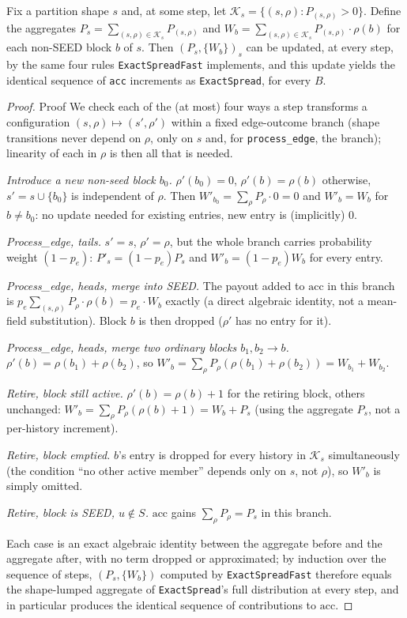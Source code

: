 \documentclass[ijoc,sglanonrev]{informs4}
\begin{document}
\begin{repeattheorem}
Fix a partition shape $s$ and, at some step, let
$\mathcal K_s=\{(s,\rho):P_{(s,\rho)}>0\}$. Define the aggregates
$P_s=\sum_{(s,\rho)\in\mathcal K_s}P_{(s,\rho)}$ and
$W_b=\sum_{(s,\rho)\in\mathcal K_s}P_{(s,\rho)}\cdot\rho(b)$ for each
non-SEED block $b$ of $s$. Then $(P_s,\{W_b\})_s$ can be updated, at every
step, by the same four rules \texttt{ExactSpreadFast} implements, and this
update yields the identical sequence of \texttt{acc} increments as
\texttt{ExactSpread}, for every $B$.
\end{repeattheorem}
\begin{proof}{Proof}
We check each of the (at most) four ways a step transforms a configuration
$(s,\rho)\mapsto(s',\rho')$ within a fixed edge-outcome branch (shape
transitions never depend on $\rho$, only on $s$ and, for
\texttt{process\_edge}, the branch); linearity of each in $\rho$ is then
all that is needed.

\emph{Introduce a new non-seed block $b_0$.} $\rho'(b_0)=0$,
$\rho'(b)=\rho(b)$ otherwise, $s'=s\cup\{b_0\}$ is independent of $\rho$.
Then $W'_{b_0}=\sum_\rho P_\rho\cdot 0=0$ and $W'_b=W_b$ for $b\ne b_0$: no
update needed for existing entries, new entry is (implicitly) $0$.

\emph{Process\_edge, tails.} $s'=s$, $\rho'=\rho$, but the whole branch
carries probability weight $(1-p_e)$: $P'_s=(1-p_e)P_s$ and
$W'_b=(1-p_e)W_b$ for every entry.

\emph{Process\_edge, heads, merge into SEED.} The payout added to
$\mathrm{acc}$ in this branch is
$p_e\sum_{(s,\rho)}P_\rho\cdot\rho(b)=p_e\cdot W_b$ exactly (a direct
algebraic identity, not a mean-field substitution). Block $b$ is then
dropped ($\rho'$ has no entry for it).

\emph{Process\_edge, heads, merge two ordinary blocks $b_1,b_2\to b$.}
$\rho'(b)=\rho(b_1)+\rho(b_2)$, so
$W'_b=\sum_\rho P_\rho(\rho(b_1)+\rho(b_2))=W_{b_1}+W_{b_2}$.

\emph{Retire, block still active.} $\rho'(b)=\rho(b)+1$ for the retiring
block, others unchanged: $W'_b=\sum_\rho P_\rho(\rho(b)+1)=W_b+P_s$ (using
the aggregate $P_s$, not a per-history increment).

\emph{Retire, block emptied.} $b$'s entry is dropped for every history in
$\mathcal K_s$ simultaneously (the condition ``no other active member''
depends only on $s$, not $\rho$), so $W'_b$ is simply omitted.

\emph{Retire, block is SEED, $u\notin S$.} $\mathrm{acc}$ gains
$\sum_\rho P_\rho=P_s$ in this branch.

Each case is an exact algebraic identity between the aggregate before and
the aggregate after, with no term dropped or approximated; by induction
over the sequence of steps, $(P_s,\{W_b\})$ computed by
\texttt{ExactSpreadFast} therefore equals the shape-lumped aggregate of
\texttt{ExactSpread}'s full distribution at every step, and in particular
produces the identical sequence of contributions to $\mathrm{acc}$.\Halmos
\end{proof}
\end{document}
